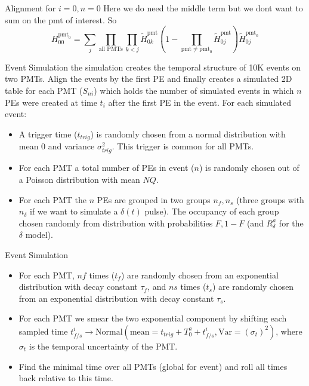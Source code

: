 \documentclass{beamer}
\begin{document}
\begin{frame}{Alignment for $i=0, n=0$}
Here we do need the middle term but we dont want to sum on the pmt of interest. So
\begin{equation}
H_{00}^{\text{pmt}_0}=\sum_j\prod_{\text{all PMTs}}\prod_{k<j}\tilde{H}_{0k}^{\text{pmt}}\left(1-\prod_{\text{pmt}\neq\text{pmt}_0}\tilde{H}_{0j}^{\text{pmt}}\right)\tilde{H}_{0j}^{\text{pmt}_0}
\end{equation}
\end{frame}

\begin{frame}{Event Simulation}
the simulation creates the temporal structure of 10K events on two PMTs. Align the events by the first PE and finally creates a simulated 2D table for each PMT ($S_{ni}$) which holds the number of simulated events in which $n$ PEs were created at time $t_i$ after the first PE in the event. 
For each simulated event:
\begin{itemize}
\item A trigger time ($t_{trig}$) is randomly chosen from a normal distribution with mean 0 and variance $\sigma_{trig}^2$. This trigger is common for all PMTs.
\item For each PMT a total number of PEs in event ($n$) is randomly chosen out of a Poisson distribution with mean $NQ$.
\item For each PMT the $n$ PEs are grouped in two groups $n_f, n_s$ (three groups with $n_\delta$ if we want to simulate a $\delta(t)$ pulse). The occupancy of each group chosen randomly from distribution with probabilities $F, 1-F$ (and $R_\delta^a$ for the $\delta$ model). 
\end{itemize}
\end{frame}

\begin{frame}{Event Simulation}
\begin{itemize}
\item For each PMT, $nf$ times ($t_f$) are randomly chosen from an exponential distribution with decay constant $\tau_f$, and $ns$ times ($t_s$) are randomly chosen from an exponential distribution with decay constant $\tau_s$.
\item For each PMT we smear the two exponential component by shifting each sampled time $t_{f/s}^i\rightarrow \text{Normal}(\text{mean}=t_{trig}+T_0^a+t_{f/s}^i, \text{Var}=(\sigma_t)^2)$, where $\sigma_t$ is the temporal uncertainty of the PMT.
\item Find the minimal time over all PMTs (global for event) and roll all times back relative to this time.
\end{itemize}
\end{frame}
\end{document}
